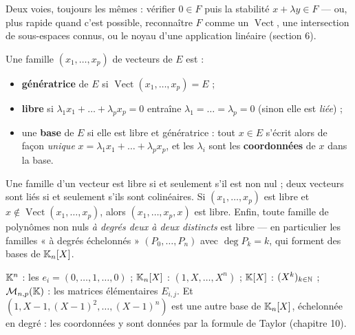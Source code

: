 \begin{savoirfaire}
Deux voies, toujours les mêmes : vérifier $0\in F$ puis la stabilité
$x+\lambda y\in F$ — ou, plus rapide quand c'est possible, reconnaître $F$
comme un $\operatorname{Vect}$, une intersection de sous-espaces connus, ou
le noyau d'une application linéaire (section 6).
\end{savoirfaire}


\begin{definition}
Une famille $(x_1,\dots,x_p)$ de vecteurs de $E$ est :
\begin{itemize}[label={\color{otNavy}\textbullet},leftmargin=1.4em,itemsep=0.6mm,topsep=0.8mm]
  \item \textbf{génératrice} de $E$ si $\operatorname{Vect}(x_1,\dots,x_p)=E$ ;
  \item \textbf{libre} si $\lambda_1x_1+\dots+\lambda_px_p=0$ entraîne
    $\lambda_1=\dots=\lambda_p=0$ (sinon elle est \emph{liée}) ;
  \item une \textbf{base} de $E$ si elle est libre et génératrice : tout
    $x\in E$ s'écrit alors de façon \emph{unique}
    $x=\lambda_1x_1+\dots+\lambda_px_p$, et les $\lambda_i$ sont les
    \textbf{coordonnées} de $x$ dans la base.
\end{itemize}
\end{definition}

\begin{propriete}
Une famille d'un vecteur est libre si et seulement s'il est non nul ; deux
vecteurs sont liés si et seulement s'ils sont colinéaires. Si
$(x_1,\dots,x_p)$ est libre et $x\notin\operatorname{Vect}(x_1,\dots,x_p)$,
alors $(x_1,\dots,x_p,x)$ est libre. Enfin, toute famille de polynômes non
nuls \emph{à degrés deux à deux distincts} est libre — en particulier les
familles « à degrés échelonnés » $(P_0,\dots,P_n)$ avec $\deg P_k=k$, qui
forment des bases de $\mathbb{K}_n[X]$.
\end{propriete}

\begin{exemple}
$\mathbb{K}^{n}$ : les $e_i=(0,\dots,1,\dots,0)$ ; $\mathbb{K}_n[X]$ : $(1,X,\dots,X^{n})$ ;
$\mathbb{K}[X]$ : $(X^{k})_{k\in\mathbb{N}}$ ; $\mathcal{M}_{n,p}(\mathbb{K})$ : les matrices
élémentaires $E_{i,j}$. Et $(1,X-1,(X-1)^{2},\dots,(X-1)^{n})$ est une
autre base de $\mathbb{K}_n[X]$, échelonnée en degré : les coordonnées y sont
données par la formule de Taylor (chapitre 10).
\end{exemple}

